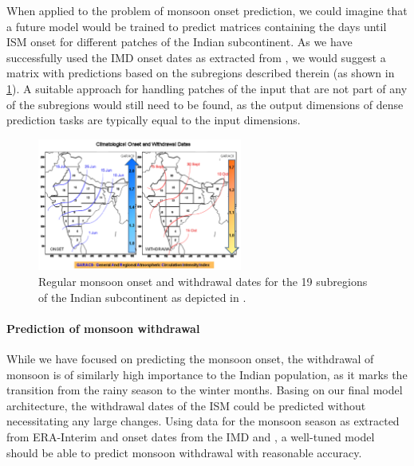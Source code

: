 When applied to the problem of monsoon onset prediction, we could imagine that a future model would be trained to predict matrices containing the days until ISM onset for different patches of the Indian subcontinent. As we have successfully used the IMD onset dates as extracted from \citet{Singh.2009}, we would suggest a matrix with predictions based on the subregions described therein (as shown in \cref{fig:singh_subregions}). A suitable approach for handling patches of the input that are not part of any of the subregions would still need to be found, as the output dimensions of dense prediction tasks are typically equal to the input dimensions.

\begin{figure}[h!]
  \centering
  \includegraphics[width=0.6\textwidth]{./99_appendix/img/singh_subregions.png}
  \caption{Regular monsoon onset and withdrawal dates for the 19 subregions of the Indian subcontinent as depicted in \citet{Singh.2009}.}
  \label{fig:singh_subregions}
\end{figure}

\paragraph{Prediction of monsoon withdrawal}
While we have focused on predicting the monsoon onset, the withdrawal of monsoon is of similarly high importance to the Indian population, as it marks the transition from the rainy season to the winter months. Basing on our final model architecture, the withdrawal dates of the ISM could be predicted without necessitating any large changes. Using data for the monsoon season as extracted from ERA-Interim and onset dates from the IMD and \citet{Singh.2009}, a well-tuned model should be able to predict monsoon withdrawal with reasonable accuracy.
